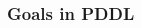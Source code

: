 \documentclass{beamer}
\begin{document}
	\begin{frame}[c]\frametitle{Goals in PDDL}
		\begin{columns}
			\begin{column}[t]{0.3\textwidth}
			
			 			
			\end{column}
			\begin{column}[t]{0.3\textwidth}
			
			 			
			\end{column}
			\begin{column}[t]{0.3\textwidth}
			
			 			
			\end{column}
		\end{columns}
% 			
% 			 			
% 			
% 			 			
% 			
% 			 			
	\end{frame}
	
\end{document}
